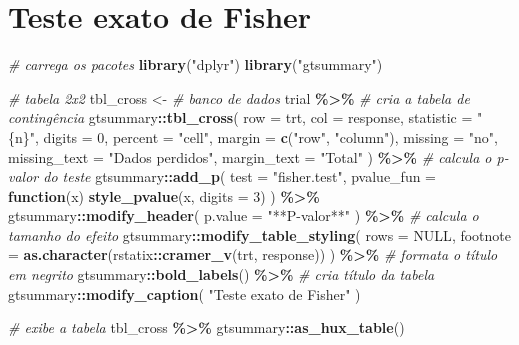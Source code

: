 \documentclass[
  a4paper,
]{book}
\newenvironment{Shaded}{\begin{snugshade}}{\end{snugshade}}
\newcommand{\AttributeTok}[1]{\textcolor[rgb]{0.13,0.29,0.53}{#1}}
\newcommand{\CommentTok}[1]{\textcolor[rgb]{0.56,0.35,0.01}{\textit{#1}}}
\newcommand{\ConstantTok}[1]{\textcolor[rgb]{0.56,0.35,0.01}{#1}}
\newcommand{\ControlFlowTok}[1]{\textcolor[rgb]{0.13,0.29,0.53}{\textbf{#1}}}
\newcommand{\DecValTok}[1]{\textcolor[rgb]{0.00,0.00,0.81}{#1}}
\newcommand{\FunctionTok}[1]{\textcolor[rgb]{0.13,0.29,0.53}{\textbf{#1}}}
\newcommand{\NormalTok}[1]{#1}
\newcommand{\OtherTok}[1]{\textcolor[rgb]{0.56,0.35,0.01}{#1}}
\newcommand{\SpecialCharTok}[1]{\textcolor[rgb]{0.81,0.36,0.00}{\textbf{#1}}}
\newcommand{\StringTok}[1]{\textcolor[rgb]{0.31,0.60,0.02}{#1}}
\begin{document}
\hypertarget{teste-exato-de-fisher}{%
\section{Teste exato de Fisher}\label{teste-exato-de-fisher}}

\begin{Shaded}
\begin{Highlighting}[]
\CommentTok{\# carrega os pacotes}
\FunctionTok{library}\NormalTok{(}\StringTok{"dplyr"}\NormalTok{)}
\FunctionTok{library}\NormalTok{(}\StringTok{"gtsummary"}\NormalTok{)}

\CommentTok{\# tabela 2x2}
\NormalTok{tbl\_cross }\OtherTok{\textless{}{-}}
  \CommentTok{\# banco de dados}
\NormalTok{  trial }\SpecialCharTok{\%\textgreater{}\%}
  \CommentTok{\# cria a tabela de contingência}
\NormalTok{  gtsummary}\SpecialCharTok{::}\FunctionTok{tbl\_cross}\NormalTok{(}
    \AttributeTok{row =}\NormalTok{ trt,}
    \AttributeTok{col =}\NormalTok{ response,}
    \AttributeTok{statistic =} \StringTok{"\{n\}"}\NormalTok{,}
    \AttributeTok{digits =} \DecValTok{0}\NormalTok{,}
    \AttributeTok{percent =} \StringTok{"cell"}\NormalTok{,}
    \AttributeTok{margin =} \FunctionTok{c}\NormalTok{(}\StringTok{"row"}\NormalTok{, }\StringTok{"column"}\NormalTok{),}
    \AttributeTok{missing =} \StringTok{"no"}\NormalTok{,}
    \AttributeTok{missing\_text =} \StringTok{"Dados perdidos"}\NormalTok{,}
    \AttributeTok{margin\_text =} \StringTok{"Total"}
\NormalTok{  ) }\SpecialCharTok{\%\textgreater{}\%}
  \CommentTok{\# calcula o p{-}valor do teste}
\NormalTok{  gtsummary}\SpecialCharTok{::}\FunctionTok{add\_p}\NormalTok{(}
    \AttributeTok{test =} \StringTok{"fisher.test"}\NormalTok{,}
    \AttributeTok{pvalue\_fun =} \ControlFlowTok{function}\NormalTok{(x) }\FunctionTok{style\_pvalue}\NormalTok{(x, }\AttributeTok{digits =} \DecValTok{3}\NormalTok{)}
\NormalTok{  ) }\SpecialCharTok{\%\textgreater{}\%}
\NormalTok{  gtsummary}\SpecialCharTok{::}\FunctionTok{modify\_header}\NormalTok{(}
    \AttributeTok{p.value =} \StringTok{"**P{-}valor**"}
\NormalTok{  ) }\SpecialCharTok{\%\textgreater{}\%}
  \CommentTok{\# calcula o tamanho do efeito}
\NormalTok{  gtsummary}\SpecialCharTok{::}\FunctionTok{modify\_table\_styling}\NormalTok{(}
    \AttributeTok{rows =} \ConstantTok{NULL}\NormalTok{,}
    \AttributeTok{footnote =} \FunctionTok{as.character}\NormalTok{(rstatix}\SpecialCharTok{::}\FunctionTok{cramer\_v}\NormalTok{(trt, response))}
\NormalTok{  ) }\SpecialCharTok{\%\textgreater{}\%}
  \CommentTok{\# formata o título em negrito}
\NormalTok{  gtsummary}\SpecialCharTok{::}\FunctionTok{bold\_labels}\NormalTok{() }\SpecialCharTok{\%\textgreater{}\%}
  \CommentTok{\# cria título da tabela}
\NormalTok{  gtsummary}\SpecialCharTok{::}\FunctionTok{modify\_caption}\NormalTok{(}
    \StringTok{"Teste exato de Fisher"}
\NormalTok{  )}

\CommentTok{\# exibe a tabela}
\NormalTok{tbl\_cross }\SpecialCharTok{\%\textgreater{}\%}
\NormalTok{  gtsummary}\SpecialCharTok{::}\FunctionTok{as\_hux\_table}\NormalTok{()}
\end{Highlighting}
\end{Shaded}
\end{document}
